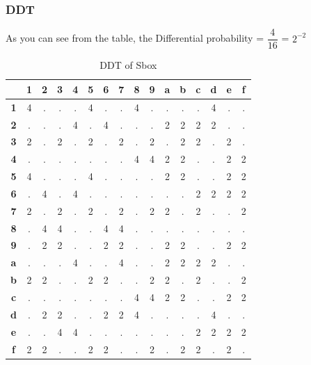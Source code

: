 \documentclass[preprint]{transcrypto}
\begin{document}
\subsubsection{DDT}
As you can see from the table, the Differential probability = $\dfrac{4}{16}$ = $2^{-2}$
\begin{table}[!h]
\centering
\begin{tabular}{|c|c|c|c|c|c|c|c|c|c|c|c|c|c|c|c|}
\hline
 &
  \textbf{1} &
  \textbf{2} &
  \textbf{3} &
  \textbf{4} &
  \textbf{5} &
  \textbf{6} &
  \textbf{7} &
  \textbf{8} &
  \textbf{9} &
  \textbf{a} &
  \textbf{b} &
  \textbf{c} &
  \textbf{d} &
  \textbf{e} &
  \textbf{f} \\ \hline
 \textbf{1}&4&.&.&.&4&.&.&4&.&.&.&.&4&.&.\\\hline
\textbf{2}&.&.&.&4&.&4&.&.&.&2&2&2&2&.&.\\\hline
\textbf{3}&2&.&2&.&2&.&2&.&2&.&2&2&.&2&.\\\hline
\textbf{4}&.&.&.&.&.&.&.&4&4&2&2&.&.&2&2\\\hline
\textbf{5}&4&.&.&.&4&.&.&.&.&2&2&.&.&2&2\\\hline
\textbf{6}&.&4&.&4&.&.&.&.&.&.&.&2&2&2&2\\\hline
\textbf{7}&2&.&2&.&2&.&2&.&2&2&.&2&.&.&2\\\hline
\textbf{8}&.&4&4&.&.&4&4&.&.&.&.&.&.&.&.\\\hline
\textbf{9}&.&2&2&.&.&2&2&.&.&2&2&.&.&2&2\\\hline
\textbf{a}&.&.&.&4&.&.&4&.&.&2&2&2&2&.&.\\\hline
\textbf{b}&2&2&.&.&2&2&.&.&2&2&.&2&.&.&2\\\hline
\textbf{c}&.&.&.&.&.&.&.&4&4&2&2&.&.&2&2\\\hline
\textbf{d}&.&2&2&.&.&2&2&4&.&.&.&.&4&.&.\\\hline
\textbf{e}&.&.&4&4&.&.&.&.&.&.&.&2&2&2&2\\\hline
\textbf{f}&2&2&.&.&2&2&.&.&2&.&2&2&.&2&.\\\hline
\end{tabular}
\caption{DDT of Sbox}
\end{table}
\end{document}
